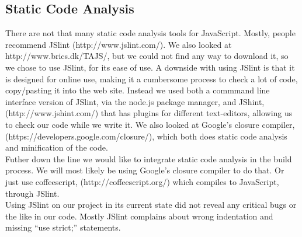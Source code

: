 \subsection{Static Code Analysis} %
\label{sub:Static Code Analysis}
There are not that many static code analysis tools for JavaScript. Mostly, people recommend JSlint (http://www.jslint.com/). We also looked at http://www.brics.dk/TAJS/, but we could not find any way to download it, so we chose to use JSlint, for its ease of use. A downside with using JSlint is that it is designed for online use, making it a cumbersome process to check a lot of code, copy/pasting it into the web site. Instead we used both a commmand line interface version of JSlint, via the node.js package manager, and JShint, (http://www.jshint.com/) that has plugins for different text-editors, allowing us to check our code while we write it. We also looked at Google's closure compiler, (https://developers.google.com/closure/), which both does static code analysis and minification of the code.\\
Futher down the line we would like to integrate static code analysis in the build process. We will most likely be using Google's closure compiler to do that. Or just use coffeescript, (http://coffeescript.org/) which compiles to JavaScript, through JSlint.\\
Using JSlint on our project in its current state did not reveal any critical bugs or the like in our code. Mostly JSlint complains about wrong indentation and missing ``use strict;'' statements.

